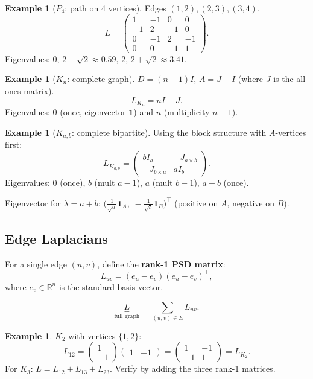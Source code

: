 \documentclass[12pt]{article}
\theoremstyle{definition}
\newtheorem{example}[theorem]{Example}
\theoremstyle{remark}
\begin{document}
\begin{example}[$P_4$: path on 4 vertices]
Edges $(1,2),(2,3),(3,4)$.
\[
  L = \begin{pmatrix}1&-1&0&0\\-1&2&-1&0\\0&-1&2&-1\\0&0&-1&1\end{pmatrix}.
\]
Eigenvalues: $0,\, 2-\sqrt2 \approx 0.59,\, 2,\, 2+\sqrt2 \approx 3.41$.
\end{example}

\begin{example}[$K_n$: complete graph]
$D = (n-1)I$, $A = J - I$ (where $J$ is the all-ones matrix).
\[
  L_{K_n} = nI - J.
\]
Eigenvalues: $0$ (once, eigenvector $\mathbf{1}$) and $n$ (multiplicity $n-1$).
\end{example}

\begin{example}[$K_{a,b}$: complete bipartite]
Using the block structure with $A$-vertices first:
\[
  L_{K_{a,b}} = \begin{pmatrix}bI_a & -J_{a\times b}\\ -J_{b\times a} & aI_b\end{pmatrix}.
\]
Eigenvalues: $0$ (once), $b$ (mult $a-1$), $a$ (mult $b-1$), $a+b$ (once).

Eigenvector for $\lambda = a+b$: $\big(\frac{1}{\sqrt{a}}\mathbf{1}_A,\; -\frac{1}{\sqrt{b}}\mathbf{1}_B\big)^\top$
(positive on $A$, negative on $B$).
\end{example}

\subsection{Edge Laplacians}

For a single edge $(u,v)$, define the \textbf{rank-1 PSD matrix}:
\[
  L_{uv} = (e_u - e_v)(e_u - e_v)^\top,
\]
where $e_v \in \mathbb{R}^n$ is the standard basis vector.

\[
  \underbrace{L}_{\text{full graph}} = \sum_{(u,v)\in E} L_{uv}.
\]

\begin{example}
$K_2$ with vertices $\{1,2\}$:
\[
  L_{12} = \begin{pmatrix}1\\-1\end{pmatrix}\begin{pmatrix}1&-1\end{pmatrix}
          = \begin{pmatrix}1&-1\\-1&1\end{pmatrix} = L_{K_2}.
\]
For $K_3$: $L = L_{12} + L_{13} + L_{23}$.  Verify by adding the three rank-1 matrices.
\end{example}
\end{document}
